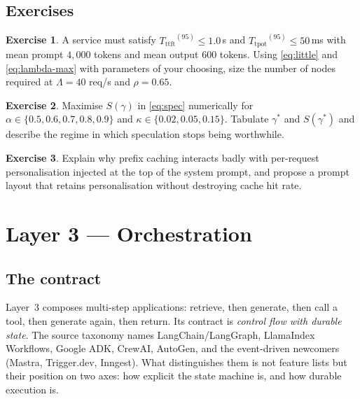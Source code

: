 \documentclass[11pt,twoside,openright]{book}
\theoremstyle{definition}
\newtheorem{exercise}{Exercise}[chapter]
\theoremstyle{plain}
\theoremstyle{remark}
\newcommand{\ttft}{\ensuremath{T_{\mathrm{ttft}}}}
\newcommand{\tpot}{\ensuremath{T_{\mathrm{tpot}}}}
\begin{document}
\section{Exercises}

\begin{exercise}
A service must satisfy $\ttft^{(95)} \le 1.0$\,s and $\tpot^{(95)} \le 50$\,ms
with mean prompt $4{,}000$ tokens and mean output $600$ tokens. Using
\eqref{eq:little} and \eqref{eq:lambda-max} with parameters of your choosing,
size the number of nodes required at $\Lambda = 40$ req/s and $\rho = 0.65$.
\end{exercise}

\begin{exercise}
Maximise $S(\gamma)$ in \eqref{eq:spec} numerically for
$\alpha \in \{0.5,0.6,0.7,0.8,0.9\}$ and $\kappa \in \{0.02, 0.05, 0.15\}$.
Tabulate $\gamma^{*}$ and $S(\gamma^{*})$ and describe the regime in which
speculation stops being worthwhile.
\end{exercise}

\begin{exercise}
Explain why prefix caching interacts badly with per-request personalisation
injected at the top of the system prompt, and propose a prompt layout that
retains personalisation without destroying cache hit rate.
\end{exercise}

\cleardoublepage

\chapter{Layer 3 --- Orchestration}
\label{ch:orchestration}

\section{The contract}

Layer~3 composes multi-step applications: retrieve, then generate, then call a
tool, then generate again, then return. Its contract is \emph{control flow with
durable state}. The source taxonomy names LangChain/LangGraph, LlamaIndex
Workflows, Google ADK, CrewAI, AutoGen, and the event-driven newcomers
(Mastra, Trigger.dev, Inngest). What distinguishes them is not feature lists but
their position on two axes: how explicit the state machine is, and how durable
execution is.
\end{document}
